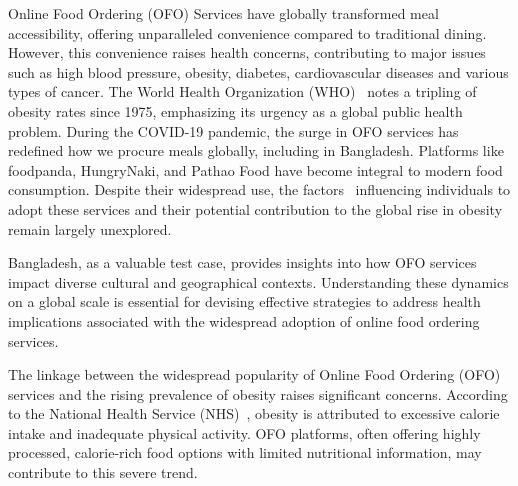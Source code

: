 \documentclass[a4paper,fleqn]{cas-sc}
\begin{document}


Online Food Ordering (OFO) Services have globally transformed meal accessibility, offering unparalleled convenience compared to traditional dining. However, this convenience raises health concerns, contributing to major issues such as high blood pressure, obesity, diabetes, cardiovascular diseases and various types of cancer. The World Health Organization (WHO)~\cite{WHO_Obesity_Factsheet} notes a tripling of obesity rates since 1975, emphasizing its urgency as a global public health problem. During the COVID-19 pandemic, the surge in OFO services has redefined how we procure meals globally, including in Bangladesh. Platforms like foodpanda, HungryNaki, and Pathao Food have become integral to modern food consumption. Despite their widespread use, the factors~\cite{dakin2024can} influencing individuals to adopt these services and their potential contribution to the global rise in obesity~\cite{weydmann2023overweight} remain largely unexplored.

Bangladesh, as a valuable test case, provides insights into how OFO services impact diverse cultural and geographical contexts. Understanding these dynamics on a global scale is essential for devising effective strategies to address health implications associated with the widespread adoption of online food ordering services.

The linkage between the widespread popularity of Online Food Ordering (OFO) services and the rising prevalence of obesity raises significant concerns. According to the National Health Service (NHS)~\cite{nhs_obesity_causes}, obesity is attributed to excessive calorie intake and inadequate physical activity. OFO platforms, often offering highly processed, calorie-rich food options with limited nutritional information, may contribute to this severe trend.
\end{document}
